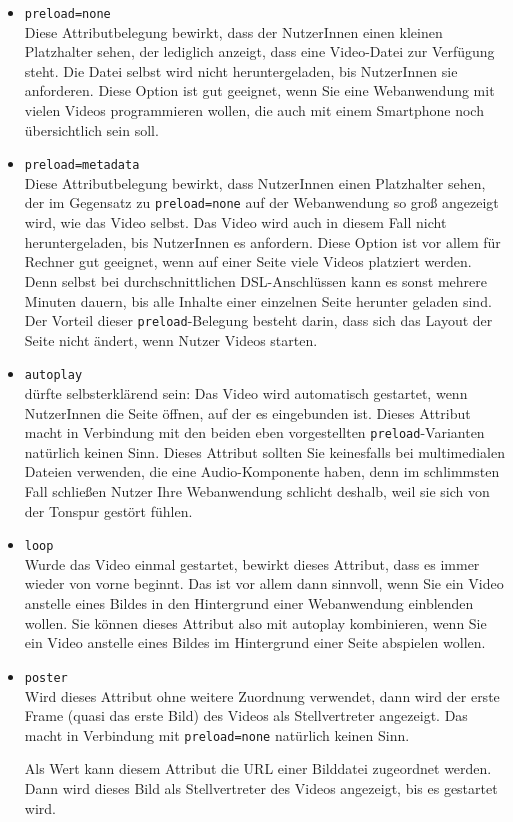 \begin{itemize}
	\item \verb|preload=none|\\		
	Diese Attributbelegung bewirkt, dass der NutzerInnen einen kleinen Platzhalter sehen, der lediglich anzeigt, dass eine Video-Datei zur Verfügung steht. Die Datei selbst wird nicht heruntergeladen, bis NutzerInnen sie anforderen. Diese Option ist gut geeignet, wenn Sie eine Webanwendung mit vielen Videos programmieren wollen, die auch mit einem Smartphone noch übersichtlich sein soll.
	
	\item \verb|preload=metadata|\\	
	Diese Attributbelegung bewirkt, dass NutzerInnen einen Platzhalter sehen, der im Gegensatz zu \verb|preload=none| auf der Webanwendung so groß angezeigt wird, wie das Video selbst. Das Video wird auch in diesem Fall nicht heruntergeladen, bis NutzerInnen es anfordern. Diese Option ist vor allem für Rechner gut geeignet, wenn auf einer Seite viele Videos platziert werden. Denn selbst bei durchschnittlichen DSL-Anschlüssen kann es sonst mehrere Minuten dauern, bis alle Inhalte einer einzelnen Seite herunter geladen sind. Der Vorteil dieser \verb|preload|-Belegung besteht darin, dass sich das Layout der Seite nicht ändert, wenn Nutzer Videos starten.
	
	\item \verb|autoplay|\\	
	dürfte selbsterklärend sein: Das Video wird automatisch gestartet, wenn NutzerInnen die Seite öffnen, auf der es eingebunden ist. Dieses Attribut macht in Verbindung mit den beiden eben vorgestellten \verb|preload|-Varianten natürlich keinen Sinn. Dieses Attribut sollten Sie keinesfalls bei multimedialen Dateien verwenden, die eine Audio-Komponente haben, denn im schlimmsten Fall schließen Nutzer Ihre Webanwendung schlicht deshalb, weil sie sich von der Tonspur gestört fühlen.
	
	\item \verb|loop|\\	
	Wurde das Video einmal gestartet, bewirkt dieses Attribut, dass es immer wieder von vorne beginnt. Das ist vor allem dann sinnvoll, wenn Sie ein Video anstelle eines Bildes in den Hintergrund einer Webanwendung einblenden wollen. Sie können dieses Attribut also mit autoplay kombinieren, wenn Sie ein Video anstelle eines Bildes im Hintergrund einer Seite abspielen wollen.
	
	\item \verb|poster|\\	
	Wird dieses Attribut ohne weitere Zuordnung verwendet, dann wird der erste Frame (quasi das erste Bild) des Videos als Stellvertreter angezeigt. Das macht in Verbindung mit \verb|preload=none| natürlich keinen Sinn.
	
	Als Wert kann diesem Attribut die URL einer Bilddatei zugeordnet werden. Dann wird dieses Bild als Stellvertreter des Videos angezeigt, bis es gestartet wird.
\end{itemize}

